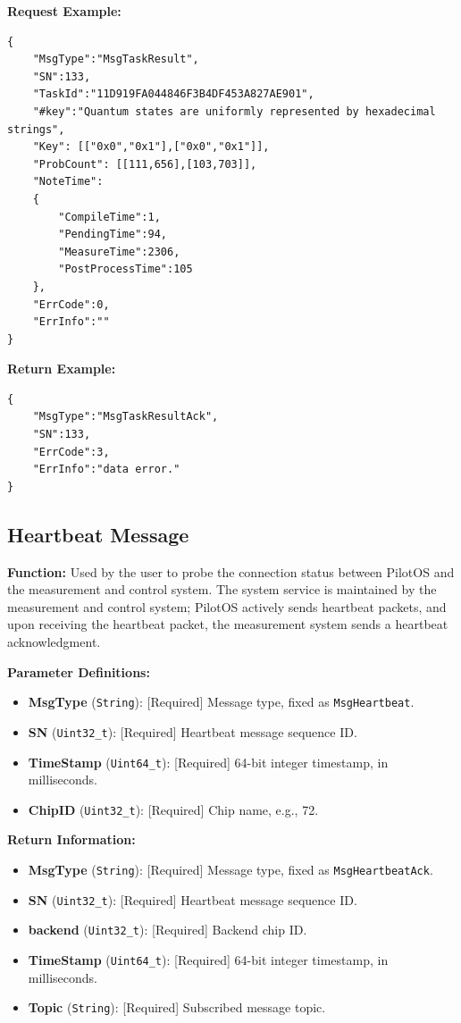 \documentclass[12pt, a4paper]{article}
\begin{document}
\noindent \textbf{Request Example:}
\begin{lstlisting}
{
    "MsgType":"MsgTaskResult",
    "SN":133,
    "TaskId":"11D919FA044846F3B4DF453A827AE901",
    "#key":"Quantum states are uniformly represented by hexadecimal strings",
    "Key": [["0x0","0x1"],["0x0","0x1"]],
    "ProbCount": [[111,656],[103,703]],
    "NoteTime":
    {
        "CompileTime":1,
        "PendingTime":94,
        "MeasureTime":2306,
        "PostProcessTime":105
    },
    "ErrCode":0,
    "ErrInfo":""
}
\end{lstlisting}

\noindent \textbf{Return Example:}
\begin{lstlisting}
{
    "MsgType":"MsgTaskResultAck",
    "SN":133,
    "ErrCode":3,
    "ErrInfo":"data error."
}
\end{lstlisting}

\subsection{Heartbeat Message}

\textbf{Function:} Used by the user to probe the connection status between PilotOS and the measurement and control system. The system service is maintained by the measurement and control system; PilotOS actively sends heartbeat packets, and upon receiving the heartbeat packet, the measurement system sends a heartbeat acknowledgment.

\textbf{Parameter Definitions:}
\begin{itemize}
    \item \textbf{MsgType} (\texttt{String}): [Required] Message type, fixed as \texttt{MsgHeartbeat}.
    \item \textbf{SN} (\texttt{Uint32\_t}): [Required] Heartbeat message sequence ID.
    \item \textbf{TimeStamp} (\texttt{Uint64\_t}): [Required] 64-bit integer timestamp, in milliseconds.
    \item \textbf{ChipID} (\texttt{Uint32\_t}): [Required] Chip name, e.g., 72.
\end{itemize}

\textbf{Return Information:}
\begin{itemize}
    \item \textbf{MsgType} (\texttt{String}): [Required] Message type, fixed as \texttt{MsgHeartbeatAck}.
    \item \textbf{SN} (\texttt{Uint32\_t}): [Required] Heartbeat message sequence ID.
    \item \textbf{backend} (\texttt{Uint32\_t}): [Required] Backend chip ID.
    \item \textbf{TimeStamp} (\texttt{Uint64\_t}): [Required] 64-bit integer timestamp, in milliseconds.
    \item \textbf{Topic} (\texttt{String}): [Required] Subscribed message topic.
\end{itemize}
\end{document}
